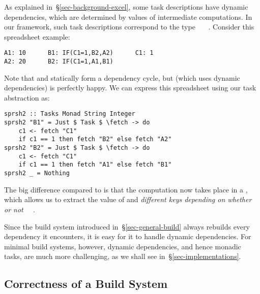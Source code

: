 As explained in~\S\ref{sec-background-excel}, some task descriptions have
dynamic dependencies, which are determined by values of intermediate
computations. In our framework, such task descriptions correspond to the type
~~~. Consider this spreadsheet example:

\vspace{0.5mm}
\begin{verbatim}
A1: 10      B1: IF(C1=1,B2,A2)      C1: 1
A2: 20      B2: IF(C1=1,A1,B1)
\end{verbatim}
\vspace{0.5mm}

\noindent
Note that  and  statically form a dependency cycle, but \Excel
(which uses dynamic dependencies) is perfectly happy. We can express this
spreadsheet using our task abstraction as:


\vspace{0.5mm}
\begin{verbatim}
sprsh2 :: Tasks Monad String Integer
sprsh2 "B1" = Just $ Task $ \fetch -> do
    c1 <- fetch "C1"
    if c1 == 1 then fetch "B2" else fetch "A2"
sprsh2 "B2" = Just $ Task $ \fetch -> do
    c1 <- fetch "C1"
    if c1 == 1 then fetch "A1" else fetch "B1"
sprsh2 _ = Nothing
\end{verbatim}
\vspace{0.5mm}

\noindent
The big difference compared to  is that the computation now takes
place in a , which allows us to extract the value of  and
 \emph{different keys depending on whether or not ~\hs{==}~}.

Since the  build system introduced in~\S\ref{sec-general-build} always
rebuilds every dependency it encounters, it is easy for it to handle dynamic
dependencies. For minimal build systems, however, dynamic dependencies, and hence
monadic tasks, are much more challenging, as we shall see
in~\S\ref{sec-implementations}.

\subsection{Correctness of a Build System}\label{sec-build-correctness}

